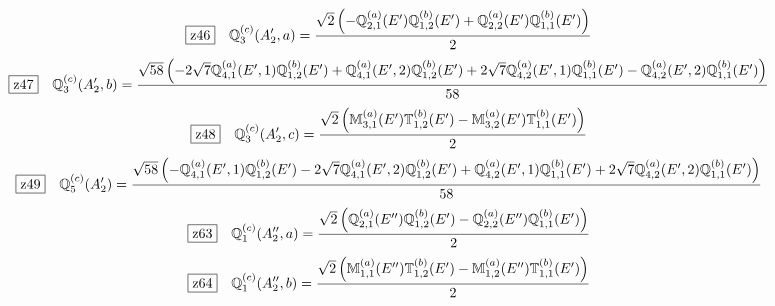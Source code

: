 \documentclass[fleqn,10pt,landscape]{jsarticle}
\begin{document}
\begin{dmath*}
\hspace*{3mm}\fbox{z46}\quad \mathbb{Q}_{3}^{(c)}(A_{2}^{\prime},a)=\frac{\sqrt{2} \left(- \mathbb{Q}_{2,1}^{(a)}(E^{\prime}) \mathbb{Q}_{1,2}^{(b)}(E^{\prime}) + \mathbb{Q}_{2,2}^{(a)}(E^{\prime}) \mathbb{Q}_{1,1}^{(b)}(E^{\prime})\right)}{2}
\end{dmath*}
\begin{dmath*}
\hspace*{3mm}\fbox{z47}\quad \mathbb{Q}_{3}^{(c)}(A_{2}^{\prime},b)=\frac{\sqrt{58} \left(- 2 \sqrt{7} \mathbb{Q}_{4,1}^{(a)}(E^{\prime},1) \mathbb{Q}_{1,2}^{(b)}(E^{\prime}) + \mathbb{Q}_{4,1}^{(a)}(E^{\prime},2) \mathbb{Q}_{1,2}^{(b)}(E^{\prime}) + 2 \sqrt{7} \mathbb{Q}_{4,2}^{(a)}(E^{\prime},1) \mathbb{Q}_{1,1}^{(b)}(E^{\prime}) - \mathbb{Q}_{4,2}^{(a)}(E^{\prime},2) \mathbb{Q}_{1,1}^{(b)}(E^{\prime})\right)}{58}
\end{dmath*}
\begin{dmath*}
\hspace*{3mm}\fbox{z48}\quad \mathbb{Q}_{3}^{(c)}(A_{2}^{\prime},c)=\frac{\sqrt{2} \left(\mathbb{M}_{3,1}^{(a)}(E^{\prime}) \mathbb{T}_{1,2}^{(b)}(E^{\prime}) - \mathbb{M}_{3,2}^{(a)}(E^{\prime}) \mathbb{T}_{1,1}^{(b)}(E^{\prime})\right)}{2}
\end{dmath*}
\begin{dmath*}
\hspace*{3mm}\fbox{z49}\quad \mathbb{Q}_{5}^{(c)}(A_{2}^{\prime})=\frac{\sqrt{58} \left(- \mathbb{Q}_{4,1}^{(a)}(E^{\prime},1) \mathbb{Q}_{1,2}^{(b)}(E^{\prime}) - 2 \sqrt{7} \mathbb{Q}_{4,1}^{(a)}(E^{\prime},2) \mathbb{Q}_{1,2}^{(b)}(E^{\prime}) + \mathbb{Q}_{4,2}^{(a)}(E^{\prime},1) \mathbb{Q}_{1,1}^{(b)}(E^{\prime}) + 2 \sqrt{7} \mathbb{Q}_{4,2}^{(a)}(E^{\prime},2) \mathbb{Q}_{1,1}^{(b)}(E^{\prime})\right)}{58}
\end{dmath*}
\begin{dmath*}
\hspace*{3mm}\fbox{z63}\quad \mathbb{Q}_{1}^{(c)}(A_{2}^{\prime\prime},a)=\frac{\sqrt{2} \left(\mathbb{Q}_{2,1}^{(a)}(E^{\prime\prime}) \mathbb{Q}_{1,2}^{(b)}(E^{\prime}) - \mathbb{Q}_{2,2}^{(a)}(E^{\prime\prime}) \mathbb{Q}_{1,1}^{(b)}(E^{\prime})\right)}{2}
\end{dmath*}
\begin{dmath*}
\hspace*{3mm}\fbox{z64}\quad \mathbb{Q}_{1}^{(c)}(A_{2}^{\prime\prime},b)=\frac{\sqrt{2} \left(\mathbb{M}_{1,1}^{(a)}(E^{\prime\prime}) \mathbb{T}_{1,2}^{(b)}(E^{\prime}) - \mathbb{M}_{1,2}^{(a)}(E^{\prime\prime}) \mathbb{T}_{1,1}^{(b)}(E^{\prime})\right)}{2}
\end{dmath*}
\end{document}
